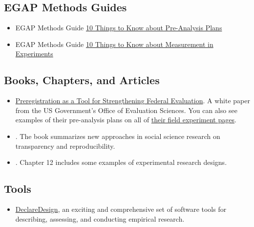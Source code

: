 \documentclass[12pt,]{book}
\providecommand{\tightlist}{%
  \setlength{\itemsep}{0pt}\setlength{\parskip}{0pt}}
\begin{document}
\hypertarget{egap-methods-guides}{%
\subsection{EGAP Methods Guides}\label{egap-methods-guides}}

\begin{itemize}
\item
  EGAP Methods Guide \href{https://egap.org/resource/10-things-to-know-about-pre-analysis-plans/}{10 Things to Know about Pre-Analysis Plans}
\item
  EGAP Methods Guide \href{https://egap.org/resource/10-things-to-know-about-measurement-in-experiments/}{10 Things to Know about Measurement in Experiments}
\end{itemize}

\hypertarget{books-chapters-and-articles}{%
\subsection{Books, Chapters, and Articles}\label{books-chapters-and-articles}}

\begin{itemize}
\item
  \href{https://oes.gsa.gov/assets/files/preregistration-as-a-tool-in-federal-evaluation.pdf}{Preregistration as a Tool for Strengthening Federal Evaluation}. A white paper from the US Government's Office of Evaluation Sciences. You can also see examples of their pre-analysis plans on all of \href{https://oes.gsa.gov/work/}{their field experiment pages}.
\item
  \autocite{christensen_transparent_2019}. The book summarizes new approaches in social science research on transparency and reproducibility.
\item
  \autocite{gerber_field_2012}. Chapter 12 includes some examples of experimental research designs.
\end{itemize}

\hypertarget{tools}{%
\subsection{Tools}\label{tools}}

\begin{itemize}
\tightlist
\item
  \href{https://declaredesign.org/}{DeclareDesign}, an exciting and comprehensive set of software tools for describing, assessing, and conducting empirical research.
\end{itemize}
\end{document}
